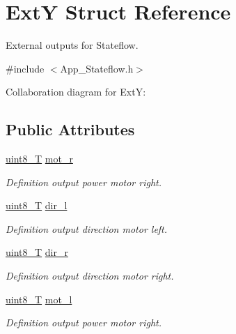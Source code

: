 \hypertarget{struct_ext_y}{}\section{ExtY Struct Reference}
\label{struct_ext_y}


External outputs for Stateflow.  




{\ttfamily \#include $<$App\+\_\+\+Stateflow.\+h$>$}



Collaboration diagram for ExtY\+:
\subsection*{Public Attributes}
\begin{DoxyCompactItemize}
\item 
\mbox{\hyperlink{_app___stateflowtypes_8h_a2532a6244e023eee49f315c10f1f7c53}{uint8\+\_\+T}} \mbox{\hyperlink{struct_ext_y_aa589c8750c337a99456c3e29975ec7fb}{mot\+\_\+r}}
\begin{DoxyCompactList}\small\item\em Definition output power motor right. \end{DoxyCompactList}\item 
\mbox{\hyperlink{_app___stateflowtypes_8h_a2532a6244e023eee49f315c10f1f7c53}{uint8\+\_\+T}} \mbox{\hyperlink{struct_ext_y_a95dca3013d0094be95ffd4af4d1a645e}{dir\+\_\+l}}
\begin{DoxyCompactList}\small\item\em Definition output direction motor left. \end{DoxyCompactList}\item 
\mbox{\hyperlink{_app___stateflowtypes_8h_a2532a6244e023eee49f315c10f1f7c53}{uint8\+\_\+T}} \mbox{\hyperlink{struct_ext_y_abe09271200dc96e32093a19312a23686}{dir\+\_\+r}}
\begin{DoxyCompactList}\small\item\em Definition output direction motor right. \end{DoxyCompactList}\item 
\mbox{\hyperlink{_app___stateflowtypes_8h_a2532a6244e023eee49f315c10f1f7c53}{uint8\+\_\+T}} \mbox{\hyperlink{struct_ext_y_a20f11c28f5b2d9f4a24766c4d56678e9}{mot\+\_\+l}}
\begin{DoxyCompactList}\small\item\em Definition output power motor right. \end{DoxyCompactList}\end{DoxyCompactItemize}


